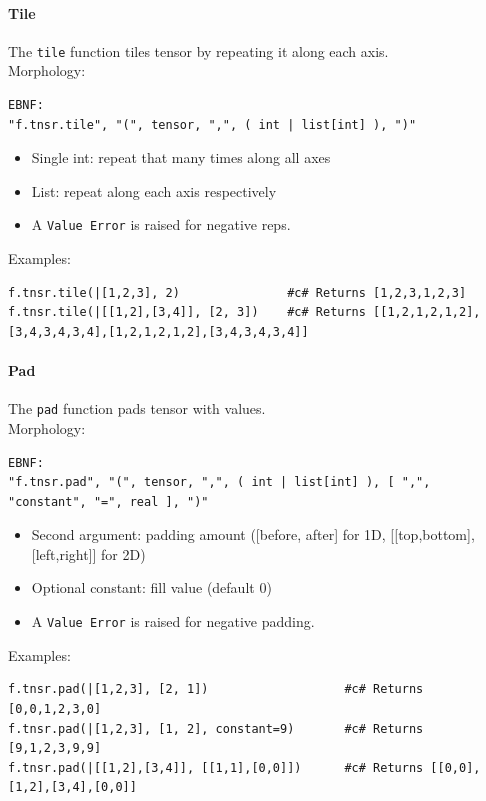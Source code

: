 \paragraph{Tile}
The \texttt{tile} function tiles tensor by repeating it along each axis.\\
Morphology:
\begin{verbatim}
EBNF:
"f.tnsr.tile", "(", tensor, ",", ( int | list[int] ), ")"
\end{verbatim}
\begin{itemize}
\item Single int: repeat that many times along all axes
\item List: repeat along each axis respectively
\item A \texttt{Value Error} is raised for negative reps.
\end{itemize}
Examples:
\begin{verbatim}
f.tnsr.tile(|[1,2,3], 2)               #c# Returns [1,2,3,1,2,3]
f.tnsr.tile(|[[1,2],[3,4]], [2, 3])    #c# Returns [[1,2,1,2,1,2],[3,4,3,4,3,4],[1,2,1,2,1,2],[3,4,3,4,3,4]]
\end{verbatim}

\paragraph{Pad}
The \texttt{pad} function pads tensor with values.\\
Morphology:
\begin{verbatim}
EBNF:
"f.tnsr.pad", "(", tensor, ",", ( int | list[int] ), [ ",", "constant", "=", real ], ")"
\end{verbatim}
\begin{itemize}
\item Second argument: padding amount ([before, after] for 1D, [[top,bottom],[left,right]] for 2D)
\item Optional constant: fill value (default 0)
\item A \texttt{Value Error} is raised for negative padding.
\end{itemize}
Examples:
\begin{verbatim}
f.tnsr.pad(|[1,2,3], [2, 1])                   #c# Returns [0,0,1,2,3,0]
f.tnsr.pad(|[1,2,3], [1, 2], constant=9)       #c# Returns [9,1,2,3,9,9]
f.tnsr.pad(|[[1,2],[3,4]], [[1,1],[0,0]])      #c# Returns [[0,0],[1,2],[3,4],[0,0]]
\end{verbatim}


